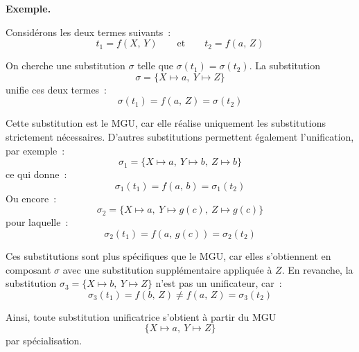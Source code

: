 \documentclass[11pt]{article}
\newenvironment{paraph}[1]{%
  \medskip
  \noindent\textbf{#1.}\quad

  \vspace{0.2cm}
}{%
  \medskip
}
\begin{document}
\begin{paraph}{Exemple}
Considérons les deux termes suivants~:
\[
    t_1 = f(X,\, Y) \qquad \text{et} \qquad t_2 = f(a,\, Z)
\]

On cherche une substitution $\sigma$ telle que $\sigma(t_1)=\sigma(t_2)$.
La substitution
\[
    \sigma = \{X \mapsto a,\ Y \mapsto Z\}
\]
unifie ces deux termes~:
\[
    \sigma(t_1)=f(a,\, Z)=\sigma(t_2)
\]

Cette substitution est le MGU, car elle réalise uniquement les substitutions strictement nécessaires.
D’autres substitutions permettent également l’unification, par exemple~:
\[
    \sigma_1 = \{X \mapsto a,\ Y \mapsto b,\ Z \mapsto b\}
\]
ce qui donne~:
\[
    \sigma_1(t_1)=f(a,\, b)=\sigma_1(t_2)
\]
Ou encore~:
\[
    \sigma_2 = \{X \mapsto a,\ Y \mapsto g(c),\ Z \mapsto g(c)\}
\]
pour laquelle~:
\[
    \sigma_2(t_1)=f(a,\, g(c))=\sigma_2(t_2)
\]

\vspace{0.2cm}
Ces substitutions sont plus spécifiques que le MGU, 
car elles s’obtiennent en composant $\sigma$ avec une substitution 
supplémentaire appliquée à $Z$. En revanche, la substitution $\sigma_3 = \{X \mapsto b,\ Y \mapsto Z\}$
n’est pas un unificateur, car~:
\[
    \sigma_3(t_1)=f(b,\, Z)\neq f(a,\, Z)=\sigma_3(t_2)
\]

Ainsi, toute substitution unificatrice s’obtient à partir du MGU
\[
    \{X \mapsto a,\ Y \mapsto Z\}
\]
par spécialisation.
\end{paraph}
\end{document}
